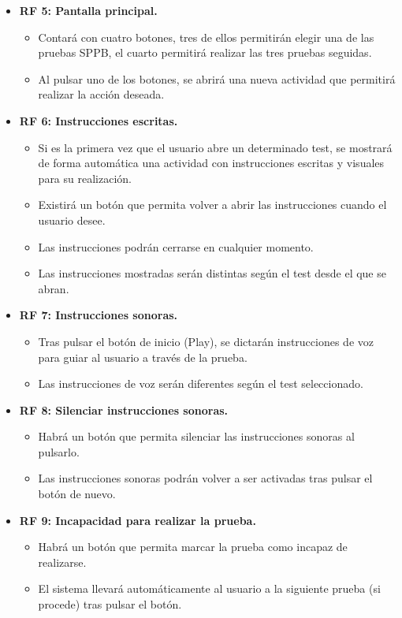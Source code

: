 \begin{itemize}
    \item \textbf{RF 5: Pantalla principal.} 
    \begin{itemize}
        \item Contará con cuatro botones, tres de ellos permitirán elegir una de las pruebas SPPB, el cuarto permitirá realizar las tres pruebas seguidas.
        \item Al pulsar uno de los botones, se abrirá una nueva actividad que permitirá realizar la acción deseada.
    \end{itemize}
    
    \item \textbf{RF 6: Instrucciones escritas.} 
    \begin{itemize}
        \item Si es la primera vez que el usuario abre un determinado test, se mostrará de forma automática una actividad con instrucciones escritas y visuales para su realización.
        \item Existirá un botón que permita volver a abrir las instrucciones cuando el usuario desee.
        \item Las instrucciones podrán cerrarse en cualquier momento.
        \item Las instrucciones mostradas serán distintas según el test desde el que se abran.
    \end{itemize}
    
    \item \textbf{RF 7: Instrucciones sonoras.} 
    \begin{itemize}
        \item Tras pulsar el botón de inicio (Play), se dictarán instrucciones de voz para guiar al usuario a través de la prueba.
        \item Las instrucciones de voz serán diferentes según el test seleccionado.
    \end{itemize}
    
    \item \textbf{RF 8: Silenciar instrucciones sonoras.} 
    \begin{itemize}
        \item Habrá un botón que permita silenciar las instrucciones sonoras al pulsarlo.
        \item Las instrucciones sonoras podrán volver a ser activadas tras pulsar el botón de nuevo.
    \end{itemize}
    
    \item \textbf{RF 9: Incapacidad para realizar la prueba.} 
    \begin{itemize}
        \item Habrá un botón que permita marcar la prueba como incapaz de realizarse.
        \item El sistema llevará automáticamente al usuario a la siguiente prueba (si procede) tras pulsar el botón.
    \end{itemize}
    

\end{itemize}
